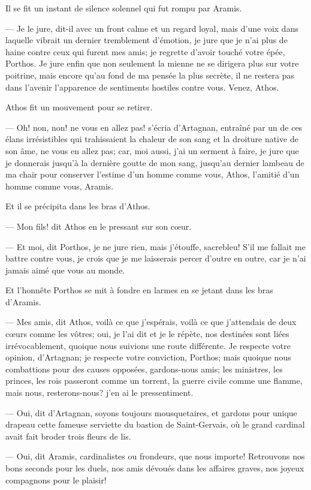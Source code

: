 Il se fit un instant de silence solennel qui fut rompu par Aramis.

— Je le jure, dit-il avec un front calme et un regard loyal, mais d'une voix dans laquelle vibrait un dernier tremblement d'émotion, je jure que je n'ai plus de haine contre ceux qui furent mes amis; je regrette d'avoir touché votre épée, Porthos. Je jure enfin que non seulement la mienne ne se dirigera plus sur votre poitrine, mais encore qu'au fond de ma pensée la plus secrète, il ne restera pas dans l'avenir l'apparence de sentiments hostiles contre vous. Venez, Athos.

Athos fit un mouvement pour se retirer.

— Oh! non, non! ne vous en allez pas! s'écria d'Artagnan, entraîné par un de ces élans irrésistibles qui trahissaient la chaleur de son sang et la droiture native de son âme, ne vous en allez pas; car, moi aussi, j'ai un serment à faire, je jure que je donnerais jusqu'à la dernière goutte de mon sang, jusqu'au dernier lambeau de ma chair pour conserver l'estime d'un homme comme vous, Athos, l'amitié d'un homme comme vous, Aramis.

Et il se précipita dans les bras d'Athos.

— Mon fils! dit Athos en le pressant sur son cœur.

— Et moi, dit Porthos, je ne jure rien, mais j'étouffe, sacrebleu! S'il me fallait me battre contre vous, je crois que je me laisserais percer d'outre en outre, car je n'ai jamais aimé que vous au monde.

Et l'honnête Porthos se mit à fondre en larmes en se jetant dans les bras d'Aramis.

— Mes amis, dit Athos, voilà ce que j'espérais, voilà ce que j'attendais de deux cœurs comme les vôtres; oui, je l'ai dit et je le répète, nos destinées sont liées irrévocablement, quoique nous suivions une route différente. Je respecte votre opinion, d'Artagnan; je respecte votre conviction, Porthos; mais quoique nous combattions pour des causes opposées, gardons-nous amis; les ministres, les princes, les rois passeront comme un torrent, la guerre civile comme une flamme, mais nous, resterons-nous? j'en ai le pressentiment.

— Oui, dit d'Artagnan, soyons toujours mousquetaires, et gardons pour unique drapeau cette fameuse serviette du bastion de Saint-Gervais, où le grand cardinal avait fait broder trois fleurs de lis.

— Oui, dit Aramis, cardinalistes ou frondeurs, que nous importe! Retrouvons nos bons seconds pour les duels, nos amis dévoués dans les affaires graves, nos joyeux compagnons pour le plaisir!

